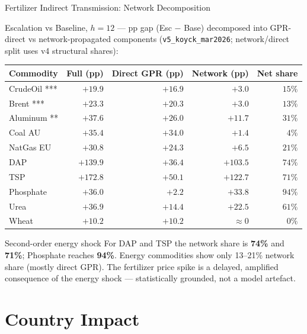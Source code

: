 ﻿\documentclass[aspectratio=1610]{beamer}
\begin{document}
\begin{frame}[shrink=10]{Fertilizer Indirect Transmission: Network Decomposition}

  Escalation vs Baseline, $h = 12$ --- pp gap (Esc $-$ Base) decomposed into
  GPR-direct vs network-propagated components (\texttt{v5\_koyck\_mar2026};
  network/direct split uses v4 structural shares):

  {\footnotesize
  \begin{tabular}{lrrrr}
    \toprule
    Commodity      & Full (pp) & Direct GPR (pp) & Network (pp) & Net share \\
    \midrule
    CrudeOil ***   & $+19.9$ & $+16.9$ & $+3.0$  & $15\%$ \\
    Brent ***      & $+23.3$ & $+20.3$ & $+3.0$  & $13\%$ \\
    Aluminum **    & $+37.6$ & $+26.0$ & $+11.7$ & $31\%$ \\
    Coal AU        & $+35.4$ & $+34.0$ & $+1.4$  & $ 4\%$ \\
    NatGas EU      & $+30.8$ & $+24.3$ & $+6.5$  & $21\%$ \\
    DAP            & $+139.9$& $+36.4$ & $+103.5$& $74\%$ \\
    TSP            & $+172.8$& $+50.1$ & $+122.7$& $71\%$ \\
    Phosphate      & $+36.0$ & $+2.2$  & $+33.8$ & $94\%$ \\
    Urea           & $+36.9$ & $+14.4$ & $+22.5$ & $61\%$ \\
    Wheat          & $+10.2$ & $+10.2$ & $\approx0$ & $0\%$ \\
    \bottomrule
  \end{tabular}
  }

  \begin{alertblock}{Second-order energy shock}
    For DAP and TSP the network share is \textbf{74\%} and \textbf{71\%}; Phosphate
    reaches \textbf{94\%}.  Energy commodities show only 13--21\% network share
    (mostly direct GPR).  The fertilizer price spike is a delayed, amplified
    consequence of the energy shock --- statistically grounded, not a model artefact.
  \end{alertblock}

\end{frame}

\section{Country Impact}
\end{document}
